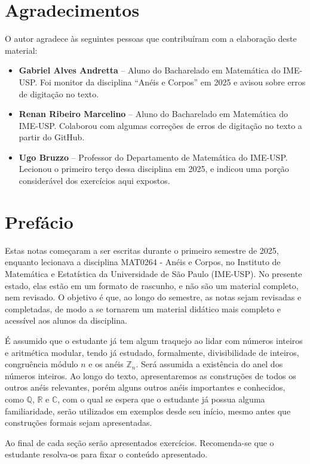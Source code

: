 \chapter{Agradecimentos}

O autor agradece às seguintes pessoas que contribuíram com a elaboração deste material:
\begin{itemize}
\item \textbf{Gabriel Alves Andretta} -- Aluno do Bacharelado em Matemática do IME-USP. Foi monitor da disciplina ``Anéis e Corpos'' em 2025 e avisou sobre erros de digitação no texto.
\item \textbf{Renan Ribeiro Marcelino} -- Aluno do Bacharelado em Matemática do IME-USP. Colaborou com algumas correções de erros de digitação no texto a partir do GitHub.
\item \textbf{Ugo Bruzzo} -- Professor do Departamento de Matemática do IME-USP. Lecionou o primeiro terço dessa disciplina em 2025, e indicou uma porção considerável dos exercícios aqui expostos.
\end{itemize}

\chapter{Prefácio}

Estas notas começaram a ser escritas durante o primeiro semestre de 2025, enquanto lecionava a disciplina MAT0264 - Anéis e Corpos, no Instituto de Matemática e Estatística da Universidade de São Paulo (IME-USP).
No presente estado, elas estão em um formato de rascunho, e não são um material completo, nem revisado. O objetivo é que, ao longo do semestre, as notas sejam revisadas e completadas, de modo a se tornarem um material didático mais completo e acessível aos alunos da disciplina.

É assumido que o estudante já tem algum traquejo ao lidar com números inteiros e aritmética modular, tendo já estudado, formalmente, divisibilidade de inteiros, congruência módulo $n$ e os anéis $\mathbb Z_n$.
Será assumida a existência do anel dos números inteiros.
Ao longo do texto, apresentaremos as construções de todos os outros anéis relevantes, porém alguns outros anéis importantes e conhecidos, como $\mathbb Q$, $\mathbb R$ e $\mathbb C$, com o qual se espera que o estudante já possua alguma familiaridade, serão utilizados em exemplos desde seu início, mesmo antes que construções formais sejam apresentadas.

Ao final de cada seção serão apresentados exercícios. Recomenda-se que o estudante resolva-os para fixar o conteúdo apresentado.